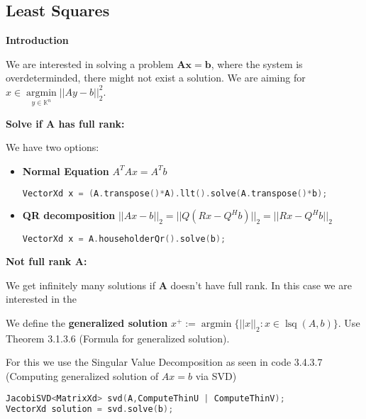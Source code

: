 \documentclass{sciposter}
\renewcommand{\vec}[1]{\mathbf{#1}}
\newcommand{\psection}[1]{\par \textbf{\large#1}}
\begin{document}
\begin{multicols}{2}
\section*{Least Squares}

\psection{Introduction}

We are interested in solving a problem $\vec{A} \vec{x} = \vec{b}$, where the system is overdeterminded, there might not exist a solution. We are aiming for $x \in \operatorname{argmin}\limits_{y\in \mathbb{K}^n} ||Ay - b||_2 ^2$.


\psection{Solve if $\vec{A}$ has full rank:}

We have two options:

\begin{itemize}
	\item \textbf{Normal Equation} $A^T Ax = A^T b$
	\begin{lstlisting}[language=c++]
	VectorXd x = (A.transpose()*A).llt().solve(A.transpose()*b);
	\end{lstlisting}
	\item \textbf{QR decomposition} $||Ax-b||_2 = ||Q(Rx - Q^H b)||_2 = ||Rx - Q^H b||_2$
	\begin{lstlisting}[language=c++]
	VectorXd x = A.householderQr().solve(b);
	\end{lstlisting}
\end{itemize}


\psection{Not full rank $\vec{A}$:}

We get infinitely many solutions if $\vec{A}$ doesn't have full rank. In this case we are interested in the 

\begin{mdframed}
	We define the \textbf{generalized solution} $x^+ := \operatorname{argmin}\{ ||x||_2 : x\in \operatorname{lsq}(A,b)\}$. Use Theorem 3.1.3.6 (Formula for generalized solution).
\end{mdframed}

For this we use the Singular Value Decomposition as seen in code 3.4.3.7 (Computing generalized solution of $Ax=b$ via SVD)


\begin{lstlisting}[language=c++]
JacobiSVD<MatrixXd> svd(A,ComputeThinU | ComputeThinV);
VectorXd solution = svd.solve(b);
\end{lstlisting}


\end{multicols}
\end{document}
